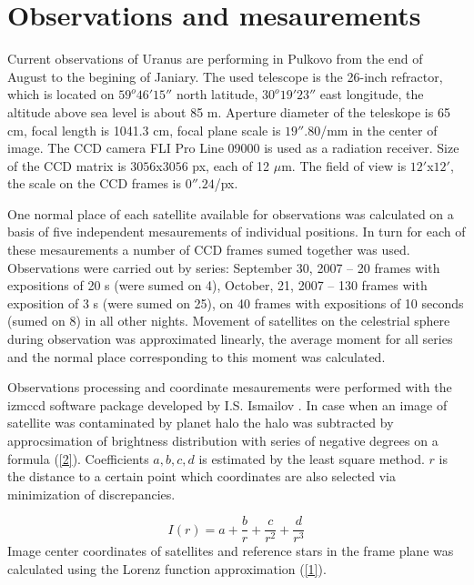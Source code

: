 \documentclass[]{article}
\begin{document}
\section{Observations and mesaurements}
Current observations of Uranus are performing in Pulkovo from the end of August to the begining of Janiary. The used telescope is the 26-inch refractor, which is located on $59^o46' 15''$ north latitude, $30^o19'23''$ east longitude, the altitude above sea level is about 85 m.  Aperture diameter of the teleskope is 65 cm, focal length is 1041.3 cm, focal plane scale is $19''.80$/mm in the center of image. The CCD camera FLI Pro Line 09000  is used as a radiation receiver. Size of the CCD matrix is $3056$x$3056$ px, each of 12 $\mu$m.  The field of view is $12'$x$12'$, the scale on the CCD frames is $0''.24$/px.\par
One normal place of each satellite available for observations was calculated on a basis of five independent mesaurements of individual positions.  In turn for each of these mesaurements a number of CCD frames sumed together was used. Observations were carried out by series: September 30, 2007 -- 20 frames with expositions of 20 s (were sumed on 4), October, 21, 2007 -- 130 frames with exposition of 3 s (were sumed on 25), on 40 frames with expositions of 10 seconds (sumed on 8) in all other nights. Movement of satellites on the celestrial sphere during observation was approximated linearly, the average moment for all series and the normal place corresponding to this moment was calculated.\par
Observations processing and coordinate mesaurements were performed with the izmccd software package developed by I.S. Ismailov \cite{3,4}. In case when an image of satellite was contaminated by planet halo the halo was subtracted by approcsimation of brightness distribution with series of negative degrees on a formula (\ref{2}). Coefficients $a, b, c, d$ is estimated by the least square method. $r$ is the distance to a certain point which coordinates are also selected via minimization of discrepancies.\par
\begin{equation}
\label{2}
I(r) = a + \frac{b}{r} + \frac{c}{r^2} + \frac{d}{r^3}
\end{equation}
Image center coordinates of satellites and reference stars in the frame plane was calculated using the Lorenz function approximation (\ref{1}).
\end{document}

